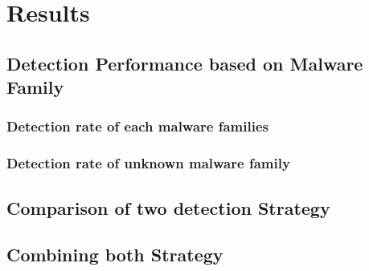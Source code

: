 \section{Results}\label{sec:results}

\subsection{Detection Performance based on Malware Family}

\subsubsection{Detection rate of each malware families}

\subsubsection{Detection rate of unknown malware family}

\subsection{Comparison of two detection Strategy}

\subsection{Combining both Strategy}


